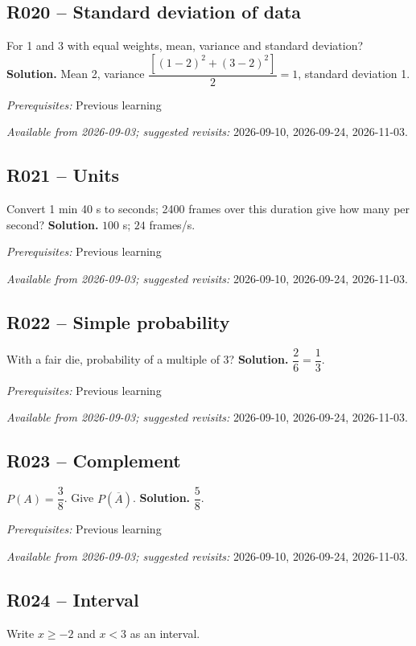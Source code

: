 \subsection*{R020 -- Standard deviation of data}\label{R020}
For 1 and 3 with equal weights, mean, variance and standard deviation?
\ifprof\textbf{Solution.} Mean 2, variance $\dfrac{[(1-2)^2+(3-2)^2]}{2}=1$, standard deviation 1.\par\textit{Prerequisites:} Previous learning\par\textit{Available from 2026-09-03; suggested revisits:} 2026-09-10, 2026-09-24, 2026-11-03.\fi
{}\subsection*{R021 -- Units}\label{R021}
Convert 1 min 40 s to seconds; 2400 frames over this duration give how many per second?
\ifprof\textbf{Solution.} $100$ s; $24$ frames/s.\par\textit{Prerequisites:} Previous learning\par\textit{Available from 2026-09-03; suggested revisits:} 2026-09-10, 2026-09-24, 2026-11-03.\fi
{}\subsection*{R022 -- Simple probability}\label{R022}
With a fair die, probability of a multiple of 3?
\ifprof\textbf{Solution.} $\dfrac{2}{6}=\dfrac{1}{3}$.\par\textit{Prerequisites:} Previous learning\par\textit{Available from 2026-09-03; suggested revisits:} 2026-09-10, 2026-09-24, 2026-11-03.\fi
{}\subsection*{R023 -- Complement}\label{R023}
$P(A)=\dfrac{3}{8}$. Give $P(\overline A)$.
\ifprof\textbf{Solution.} $\dfrac{5}{8}$.\par\textit{Prerequisites:} Previous learning\par\textit{Available from 2026-09-03; suggested revisits:} 2026-09-10, 2026-09-24, 2026-11-03.\fi
{}\subsection*{R024 -- Interval}\label{R024}
Write $x\geq-2$ and $x<3$ as an interval.
